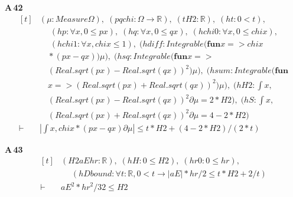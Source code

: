 \noindent\textbf{A\,42}\quad{}
{\footnotesize\[ \begin{aligned}[t]
&(\mu : \mathit{Measure} \Omega ),\; (\mathit{p} \mathit{q} \mathit{chi} : \Omega \to \mathbb{R} ),\; (\mathit{t} \mathit{H2} : \mathbb{R} ),\; (\mathit{ht} : 0 < \mathit{t}),\\
&\quad \; (\mathit{hp} : \forall \mathit{x}, 0 \leq \mathit{p} \mathit{x}),\; (\mathit{hq} : \forall \mathit{x}, 0 \leq \mathit{q} \mathit{x}),\; (\mathit{hchi0} : \forall \mathit{x}, 0 \leq \mathit{chi} \mathit{x}),\\
&\quad \; (\mathit{hchi1} : \forall \mathit{x}, \mathit{chi} \mathit{x} \leq 1),\; (\mathit{hdiff} : \mathit{Integrable} (\mathbf{fun} \mathit{x} => \mathit{chi} \mathit{x}\\
&\quad * (\mathit{p} \mathit{x} - \mathit{q} \mathit{x})) \mu ),\; (\mathit{hsq} : \mathit{Integrable} (\mathbf{fun} \mathit{x} =>\\
&\quad (\mathit{Real}.\mathit{sqrt} (\mathit{p} \mathit{x}) - \mathit{Real}.\mathit{sqrt} (\mathit{q} \mathit{x})) ^{2}) \mu ),\; (\mathit{hsum} : \mathit{Integrable} (\mathbf{fun}\\
&\quad \mathit{x} => (\mathit{Real}.\mathit{sqrt} (\mathit{p} \mathit{x}) + \mathit{Real}.\mathit{sqrt} (\mathit{q} \mathit{x})) ^{2}) \mu ),\; (\mathit{hH2} : \int \mathit{x},\\
&\quad (\mathit{Real}.\mathit{sqrt} (\mathit{p} \mathit{x}) - \mathit{Real}.\mathit{sqrt} (\mathit{q} \mathit{x})) ^{2} ∂\mu = 2 * \mathit{H2}),\; (\mathit{hS} : \int \mathit{x},\\
&\quad (\mathit{Real}.\mathit{sqrt} (\mathit{p} \mathit{x}) + \mathit{Real}.\mathit{sqrt} (\mathit{q} \mathit{x})) ^{2} ∂\mu = 4 - 2 * \mathit{H2})\\
\vdash\;&|\int \mathit{x}, \mathit{chi} \mathit{x} * (\mathit{p} \mathit{x} - \mathit{q} \mathit{x}) ∂\mu | \leq \mathit{t} * \mathit{H2} + (4 - 2 * \mathit{H2}) / (2 * \mathit{t})
\end{aligned} \]}

\noindent\textbf{A\,43}\quad{}
{\footnotesize\[ \begin{aligned}[t]
&(\mathit{H2} \mathit{aE} \mathit{hr} : \mathbb{R} ),\; (\mathit{hH} : 0 \leq \mathit{H2}),\; (\mathit{hr0} : 0 \leq \mathit{hr}),\\
&\quad \; (\mathit{hDbound} : \forall \mathit{t} : \mathbb{R} , 0 < \mathit{t} \to |\mathit{aE}| * \mathit{hr} / 2 \leq \mathit{t} * \mathit{H2} + 2 / \mathit{t})\\
\vdash\;&\mathit{aE} ^{2} * \mathit{hr} ^{2} / 32 \leq \mathit{H2}
\end{aligned} \]}

